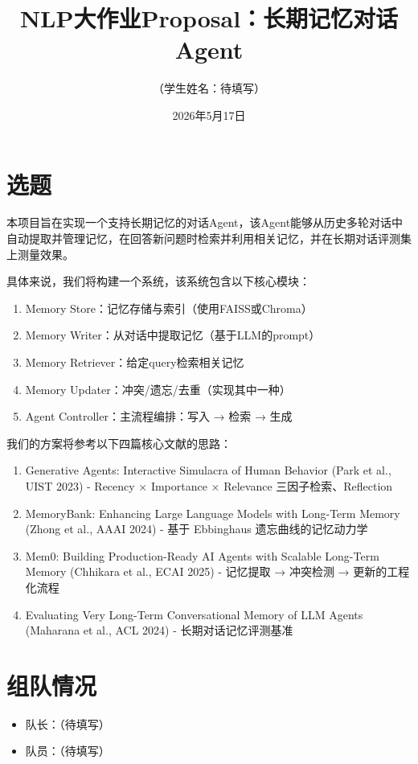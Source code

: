 \documentclass[11pt]{article}
\title{\textbf{NLP大作业Proposal：长期记忆对话Agent}}
\author{（学生姓名：待填写）}
\date{2026年5月17日}
\begin{document}
\maketitle

\section{选题}

本项目旨在实现一个支持长期记忆的对话Agent，该Agent能够从历史多轮对话中自动提取并管理记忆，在回答新问题时检索并利用相关记忆，并在长期对话评测集上测量效果。

具体来说，我们将构建一个系统，该系统包含以下核心模块：

\begin{enumerate}
\item Memory Store：记忆存储与索引（使用FAISS或Chroma）
\item Memory Writer：从对话中提取记忆（基于LLM的prompt）
\item Memory Retriever：给定query检索相关记忆
\item Memory Updater：冲突/遗忘/去重（实现其中一种）
\item Agent Controller：主流程编排：写入 → 检索 → 生成
\end{enumerate}

我们的方案将参考以下四篇核心文献的思路：

\begin{enumerate}
\item Generative Agents: Interactive Simulacra of Human Behavior (Park et al., UIST 2023) - Recency × Importance × Relevance 三因子检索、Reflection
\item MemoryBank: Enhancing Large Language Models with Long-Term Memory (Zhong et al., AAAI 2024) - 基于 Ebbinghaus 遗忘曲线的记忆动力学
\item Mem0: Building Production-Ready AI Agents with Scalable Long-Term Memory (Chhikara et al., ECAI 2025) - 记忆提取 → 冲突检测 → 更新的工程化流程
\item Evaluating Very Long-Term Conversational Memory of LLM Agents (Maharana et al., ACL 2024) - 长期对话记忆评测基准
\end{enumerate}

\section{组队情况}

\begin{itemize}
\item 队长：（待填写）
\item 队员：（待填写）
\end{itemize}
\end{document}
